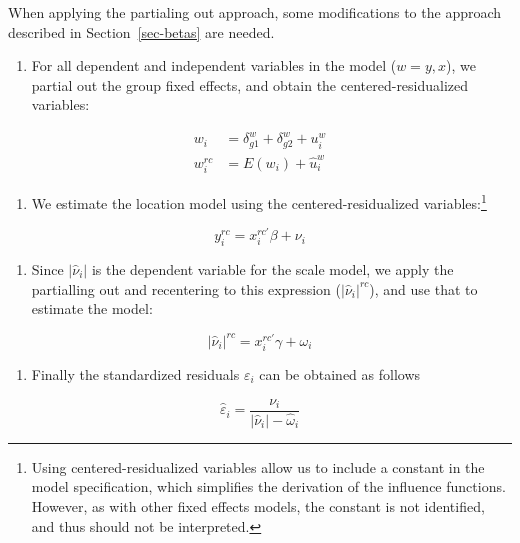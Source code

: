\documentclass[
  authoryear,
  preprint,
  1p]{elsarticle}
\providecommand{\tightlist}{%
  \setlength{\itemsep}{0pt}\setlength{\parskip}{0pt}}\usepackage{longtable,booktabs,array}
\begin{document}
When applying the partialing out approach, some modifications to the
approach described in Section~\ref{sec-betas} are needed.

\begin{enumerate}
\def\labelenumi{\arabic{enumi}.}
\tightlist
\item
  For all dependent and independent variables in the model (\(w=y,x\)),
  we partial out the group fixed effects, and obtain the
  centered-residualized variables:
\end{enumerate}

\[\begin{aligned}
w_{i} &= \delta_{g1}^w + \delta_{g2}^w + u_{i}^w \\
w_{i}^{rc} &= E(w_{i}) + \hat{u}_{i}^w
\end{aligned}
\]

\begin{enumerate}
\def\labelenumi{\arabic{enumi}.}
\setcounter{enumi}{1}
\tightlist
\item
  We estimate the location model using the centered-residualized
  variables:\footnote{Using centered-residualized variables allow us to
    include a constant in the model specification, which simplifies the
    derivation of the influence functions. However, as with other fixed
    effects models, the constant is not identified, and thus should not
    be interpreted.}
\end{enumerate}

\[y_{i}^{rc} = x_{i}^{rc'} \beta + \nu_{i}
\]

\begin{enumerate}
\def\labelenumi{\arabic{enumi}.}
\setcounter{enumi}{2}
\tightlist
\item
  Since \(|\hat \nu_i|\) is the dependent variable for the scale model,
  we apply the partialling out and recentering to this expression
  (\(|\hat \nu_i|^{rc}\)), and use that to estimate the model:
\end{enumerate}

\[|\hat\nu_{i}|^{rc} = x_{i}^{rc'} \gamma + \omega_{i}\]

\begin{enumerate}
\def\labelenumi{\arabic{enumi}.}
\setcounter{enumi}{3}
\tightlist
\item
  Finally the standardized residuals \(\varepsilon_i\) can be obtained
  as follows
\end{enumerate}

\[\hat{\varepsilon}_{i} = \frac{\nu_{i}}{|\hat\nu_{i}|- \hat \omega_{i}}\]
\end{document}
